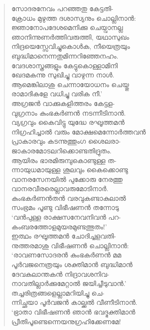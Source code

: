 \begin{verse}
സോദരനേവം പറഞ്ഞതു കേട്ടതി-\\
ക്രോധം മുഴുത്ത ദശാസ്യനും ചൊല്ലിനാന്‍:\\
ജ്ഞാനോപദേശമെനിക്കു ചെയ്വാനല്ല\\
ഞാനിന്നുണര്‍ത്തിവരുത്തി, യഥാസുഖം\\
നിദ്രയെസ്സേവിച്ചുകൊള്‍ക, നീയെത്രയും\\
ബുദ്ധിമാനെന്നതുമിന്നറിഞ്ഞേനഹം.\\
വേദശാസ്ത്രങ്ങളും കേട്ടുകൊള്ളാമിനി\\
ഖേദമകന്നു സുഖിച്ചു വാഴുന്ന നാള്‍.\\
ആമെങ്കിലാശു ചെന്നായോധനം ചെയ്തു\\
രാമാദികളേ വധിച്ചു വരിക നീ.’\\
അഗ്രജന്‍ വാക്കുകളിത്തരം കേട്ടള-\\
വുഗ്രനാം കുംഭകര്‍ണന്‍ നടന്നീടിനാന്‍.\\
വ്യഗ്രവും കൈവിട്ടു യുദ്ധേ രഘൂത്തമന്‍\\
നിഗ്രഹിച്ചാല്‍ വരും മോക്ഷമെന്നോര്‍ത്തവന്‍\\
പ്രാകാരവും കടന്നുത്തുംഗ ശൈലരാ-\\
ജാകാരമോടലറിക്കൊണ്ടതിദ്രുതം.\\
ആയിരം ഭാരമിരുമ്പുകൊണ്ടുള്ള ത-\\
ന്നായുധമായുള്ള ശൂലവും കൈക്കൊണ്ടു\\
വാനരസേനയില്‍ പുക്കോരു നേരത്തു\\
വാനരവീരരെല്ലാവരുമോടിനാര്‍.\\
കുംഭകര്‍ണന്‍തന്‍ വരവുകണ്ടാകുലാല്‍\\
സംഭ്രമം പൂണ്ടു വിഭീഷണന്‍ തന്നോടു\\
‘വന്‍പുള്ള രാക്ഷസനേവനിവന്‍ പറ-\\
കംബരത്തോളമുയരമുണ്ടത്ഭുതം!’\\
ഇത്ഥം രഘൂത്തമന്‍ ചോദിച്ചളവതി-\\
നുത്തരമാശു വിഭീഷണന്‍ ചൊല്ലിനാന്‍:\\
‘രാവണസോദരന്‍ കുംഭകര്‍ണന്‍ മമ\\
പൂര്‍വജനെത്രയും ശക്തിമാന്‍ ബുദ്ധിമാന്‍\\
ദേവകുലാന്തകന്‍ നിദ്രാവശനിവ-\\
നാവതില്ലാര്‍ക്കുമേറ്റാല്‍ ജയിച്ചീടുവാന്‍.’\\
തച്ചരിത്രങ്ങളെല്ലാമറിയിച്ചു ചെ-\\
ന്നിച്ഛയാ പൂര്‍വജന്‍ കാല്ക്കല്‍ വീണീടിനാന്‍.\\
‘ഭ്രാതാ വിഭീഷണന്‍ ഞാന്‍ ഭവദ്ഭക്തിമാന്‍\\
പ്രീതിപൂണ്ടെന്നെയനുഗ്രഹിക്കേണമേ!\\

\end{verse}
